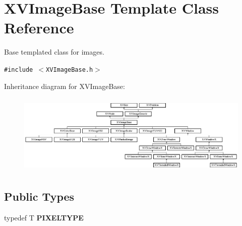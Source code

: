 \hypertarget{class_XVImageBase}{
\section{XVImage\-Base  Template Class Reference}
\label{XVImageBase}
}
Base templated class for images. 


{\tt \#include $<$XVImage\-Base.h$>$}

Inheritance diagram for XVImage\-Base:\begin{figure}[H]
\begin{center}
\leavevmode
\includegraphics[height=3.86207cm]{class_XVImageBase}
\end{center}
\end{figure}
\subsection*{Public Types}
\begin{CompactItemize}
\item 
typedef T {\bf PIXELTYPE}
\end{CompactItemize}
